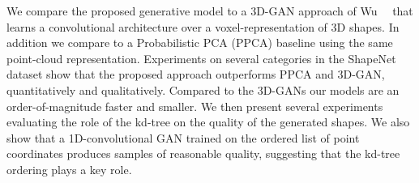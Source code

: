 We compare the proposed generative model to a 3D-GAN approach of Wu~\etal~\cite{wu2016learning} that learns a convolutional architecture over a voxel-representation of 3D shapes. In addition we compare to a Probabilistic PCA (PPCA) baseline using the same point-cloud representation. Experiments on several categories in the ShapeNet dataset show that the proposed approach outperforms PPCA and 3D-GAN, quantitatively and qualitatively. Compared to the 3D-GANs our models are an order-of-magnitude faster and smaller. We then present several experiments evaluating the role of the kd-tree on the quality of the generated shapes. We also show that a 1D-convolutional GAN trained on the ordered list of point coordinates produces samples of reasonable quality, suggesting that the kd-tree ordering plays a key role.

